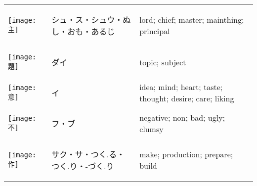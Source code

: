 \documentclass[a4paper,12pt]{extarticle}
\begin{document}
\begin{longtable}{|lp{6cm}p{4cm}|}
\begin{minipage}{0.3\textwidth}
\centerline{
	\texttt{[image: 主]}
}
\end{minipage}
&
\begin{CJK}{UTF8}{min}シュ・ス・シュウ・ぬし・おも・あるじ\end{CJK}
&
lord; chief; master; mainthing; principal
\\ 
\begin{minipage}{0.3\textwidth}
\centerline{
	\texttt{[image: 題]}
}
\end{minipage}
&
\begin{CJK}{UTF8}{min}ダイ\end{CJK}
&
topic; subject
\\ 
\begin{minipage}{0.3\textwidth}
\centerline{
	\texttt{[image: 意]}
}
\end{minipage}
&
\begin{CJK}{UTF8}{min}イ\end{CJK}
&
idea; mind; heart; taste; thought; desire; care; liking
\\ 
\begin{minipage}{0.3\textwidth}
\centerline{
	\texttt{[image: 不]}
}
\end{minipage}
&
\begin{CJK}{UTF8}{min}フ・ブ\end{CJK}
&
negative; non; bad; ugly; clumsy
\\ 
\begin{minipage}{0.3\textwidth}
\centerline{
	\texttt{[image: 作]}
}
\end{minipage}
&
\begin{CJK}{UTF8}{min}サク・サ・つく.る・つく.り・-づく.り\end{CJK}
&
make; production; prepare; build

\end{longtable}
\end{document}
